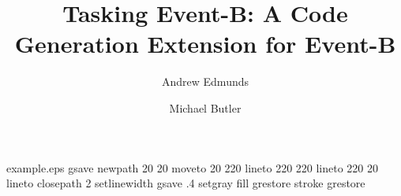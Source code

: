 %
%
%
%
%
\begin{filecontents*}{example.eps}
gsave
newpath
  20 20 moveto
  20 220 lineto
  220 220 lineto
  220 20 lineto
closepath
2 setlinewidth
gsave
  .4 setgray fill
grestore
stroke
grestore
\end{filecontents*}
%
\RequirePackage{fix-cm}
%
\documentclass[smallextended]{svjour3}       %
%
\smartqed  %
%
\usepackage{graphicx}
%
%
\usepackage{import}
\usepackage{epstopdf}
\usepackage{bsymb}
\usepackage{alltt}
\usepackage{amsmath}
\usepackage{amssymb}
\usepackage{multicol}
\usepackage{color}
\usepackage{hyperref}



\title{Tasking Event-B: A Code Generation Extension for Event-B
}


\author{Andrew Edmunds \and Michael Butler }



